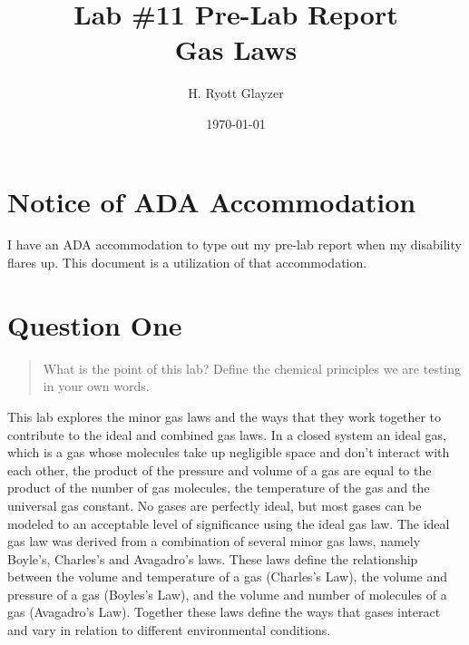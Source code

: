 \documentclass[11pt, letterpaper]{article}
\begin{document}


\title{Lab \#11 Pre-Lab Report \\ \large Gas Laws}
\author{H. Ryott Glayzer}
\date{\today}


\maketitle


\section*{Notice of ADA Accommodation}
I have an ADA accommodation to type out my pre-lab report when my disability flares up.
This document is a utilization of that accommodation.

\section{Question One}
\begin{quote}
    What is the point of this lab? Define the chemical principles we are testing in your own words.
\end{quote}

This lab explores the minor gas laws and the ways that they work together to
contribute to the ideal and combined gas laws.
In a closed system an ideal gas, which is a gas whose molecules take up negligible space and
don't interact with each other, the product of the pressure and volume of a
gas are equal to the product of the number of gas molecules, the temperature
of the gas and the universal gas constant.
No gases are perfectly ideal, but most gases can be modeled to an acceptable level
of significance using the ideal gas law.
The ideal gas law was derived from a combination of several minor gas laws,
namely Boyle's, Charles's and Avagadro's laws.
These laws define the relationship between the volume and temperature of a gas
(Charles's Law), the volume and pressure of a gas (Boyles's Law), and the 
volume and number of molecules of a gas (Avagadro's Law).
Together these laws define the ways that gases interact and vary in relation to
different environmental conditions.
\end{document}
